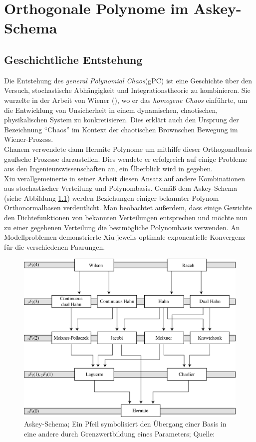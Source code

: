 
\chapter{Orthogonale Polynome im Askey-Schema} %

\label{AppendixA} %

\section{Geschichtliche Entstehung}
Die Entstehung des \emph{general Polynomial Chaos}(gPC) ist eine Geschichte über den Versuch, stochastische Abhängigkeit und Integrationstheorie zu kombinieren. Sie wurzelte in der Arbeit von Wiener (\autocite{norbertwiener1938}), wo er das \emph{homogene Chaos} einführte, um die Entwicklung von Unsicherheit in einem dynamischen, chaotischen, physikalischen System zu konkretisieren. Dies erklärt auch den Ursprung der Bezeichnung "`Chaos"' im Kontext der chaotischen Brownschen Bewegung im Wiener-Prozess.\\
Ghanem verwendete dann Hermite Polynome um mithilfe dieser Orthogonalbasis gaußsche Prozesse darzustellen. Dies wendete er erfolgreich auf einige Probleme aus den Ingenieurswissenschaften an, ein Überblick wird in \autocite{GhaSpa91} gegeben.\\
Xiu verallgemeinerte in seiner Arbeit \autocite{xiu2002} diesen Ansatz auf andere Kombinationen aus stochastischer Verteilung und Polynombasis. Gemäß dem Askey-Schema (siehe Abbildung \ref{askeyscheme}) werden Beziehungen einiger bekannter Polynom Orthonormalbasen verdeutlicht. Man beobachtet außerdem, dass einige Gewichte den Dichtefunktionen von bekannten Verteilungen entsprechen und möchte nun zu einer gegebenen Verteilung die bestmögliche Polynombasis verwenden. An Modellproblemen demonstrierte Xiu jeweils optimale exponentielle Konvergenz für die verschiedenen Paarungen.\\
\begin{figure}
\center
\includegraphics[width=0.8\linewidth]{Figures/askeyscheme.png}
\caption{Askey-Schema; Ein Pfeil symbolisiert den Übergang einer Basis in eine andere durch Grenzwertbildung eines Parameters; Quelle: \autocite{webaskey}}
\label{askeyscheme}
\end{figure}
